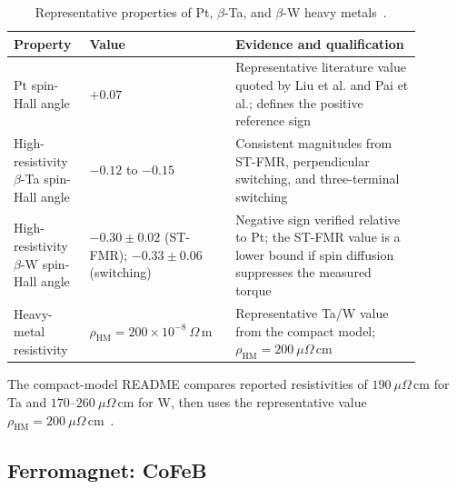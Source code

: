 \begin{table}[htbp]
    \centering
    \small
    \renewcommand{\arraystretch}{1.15}
    \begin{tabular}{p{0.16\linewidth}p{0.31\linewidth}p{0.42\linewidth}}
        \hline
        Property & Value                                                           & Evidence and qualification \\
        \hline
        Pt spin-Hall angle
                 & $+0.07$
                 & Representative literature value quoted by Liu et al. and Pai et
        al.; defines the positive reference sign                                                                \\
        High-resistivity $\beta$-Ta spin-Hall angle
                 & $-0.12$ to $-0.15$
                 & Consistent magnitudes from ST-FMR, perpendicular switching, and
        three-terminal switching                                                                                \\
        High-resistivity $\beta$-W spin-Hall angle
                 & $-0.30\pm0.02$ (ST-FMR);
        $-0.33\pm0.06$ (switching)
                 & Negative sign verified relative to Pt; the ST-FMR value is a
        lower bound if spin diffusion suppresses the measured torque                                            \\
        Heavy-metal resistivity
                 & $\rho_{\mathrm{HM}}=200\times10^{-8}\ \Omega\,\mathrm{m}$
                 & Representative Ta/W value from the compact model;
        $\rho_{\mathrm{HM}}=200\ \mu\Omega\,\mathrm{cm}$                                                        \\
        \hline
    \end{tabular}
    \caption{Representative properties of Pt, $\beta$-Ta, and $\beta$-W
        heavy metals~\cite{sot-stt-compact-model,liu2012ta-spin-hall,
            pai2012w-spin-hall}.}
    \label{tab:heavy-metal-properties}
\end{table}

The compact-model README compares reported resistivities of
$190\ \mu\Omega\,\mathrm{cm}$ for Ta and $170$--$260\ \mu\Omega\,\mathrm{cm}$
for W, then uses the representative value
$\rho_{\mathrm{HM}}=200\ \mu\Omega\,\mathrm{cm}$~\cite{sot-stt-compact-model}.

\subsection{Ferromagnet: CoFeB}

